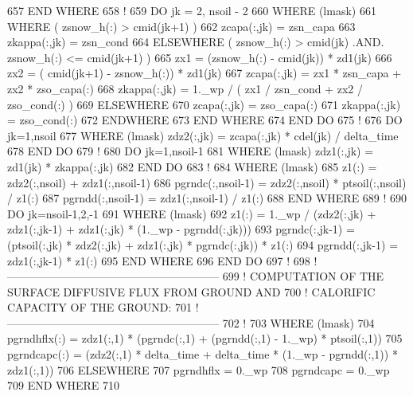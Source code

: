 \begin{DoxyCode}
657 \textcolor{keywordflow}{  END WHERE}
658 \textcolor{comment}{!}
659   \textcolor{keywordflow}{DO} jk = 2, nsoil - 2
660     \textcolor{keywordflow}{WHERE} (lmask)
661        \textcolor{keywordflow}{WHERE} ( zsnow\_h(:) > cmid(jk+1) )
662           zcapa(:,jk) = zsn\_capa
663           zkappa(:,jk) = zsn\_cond
664        \textcolor{keywordflow}{ELSEWHERE} ( zsnow\_h(:) > cmid(jk) .AND. zsnow\_h(:) <= cmid(jk+1) )
665           zx1 = (zsnow\_h(:) - cmid(jk)) * zd1(jk)
666           zx2 = ( cmid(jk+1) - zsnow\_h(:)) * zd1(jk)
667           zcapa(:,jk) = zx1 * zsn\_capa + zx2 * zso\_capa(:)
668           zkappa(:,jk) = 1.\_wp / ( zx1 / zsn\_cond + zx2 / zso\_cond(:) )
669        \textcolor{keywordflow}{ELSEWHERE}
670           zcapa(:,jk) = zso\_capa(:)
671           zkappa(:,jk) = zso\_cond(:)
672 \textcolor{keywordflow}{       ENDWHERE}
673 \textcolor{keywordflow}{     END WHERE}
674 \textcolor{keywordflow}{  END DO}
675 \textcolor{comment}{!}
676   \textcolor{keywordflow}{DO} jk=1,nsoil
677     \textcolor{keywordflow}{WHERE} (lmask) zdz2(:,jk) = zcapa(:,jk) * cdel(jk) / delta\_time
678 \textcolor{keywordflow}{  END DO}
679 \textcolor{comment}{!}
680   \textcolor{keywordflow}{DO} jk=1,nsoil-1
681     \textcolor{keywordflow}{WHERE} (lmask) zdz1(:,jk) = zd1(jk) * zkappa(:,jk)
682 \textcolor{keywordflow}{  END DO}
683 \textcolor{comment}{!}
684   \textcolor{keywordflow}{WHERE} (lmask)
685     z1(:) = zdz2(:,nsoil) + zdz1(:,nsoil-1)
686     pgrndc(:,nsoil-1) = zdz2(:,nsoil) * ptsoil(:,nsoil) / z1(:)
687     pgrndd(:,nsoil-1) = zdz1(:,nsoil-1) / z1(:)
688 \textcolor{keywordflow}{  END WHERE}
689 \textcolor{comment}{!}
690   \textcolor{keywordflow}{DO} jk=nsoil-1,2,-1
691     \textcolor{keywordflow}{WHERE} (lmask)
692       z1(:) = 1.\_wp / (zdz2(:,jk) + zdz1(:,jk-1) + zdz1(:,jk) * (1.\_wp - pgrndd(:,jk)))
693       pgrndc(:,jk-1) = (ptsoil(:,jk) * zdz2(:,jk) + zdz1(:,jk) * pgrndc(:,jk)) * z1(:)
694       pgrndd(:,jk-1) = zdz1(:,jk-1) * z1(:)
695 \textcolor{keywordflow}{    END WHERE}
696 \textcolor{keywordflow}{  END DO}
697 \textcolor{comment}{!}
698 \textcolor{comment}{!   ---------------------------------------------------------}
699 \textcolor{comment}{!   COMPUTATION OF THE SURFACE DIFFUSIVE FLUX FROM GROUND AND}
700 \textcolor{comment}{!   CALORIFIC CAPACITY OF THE GROUND:}
701 \textcolor{comment}{!   ---------------------------------------------------------}
702 \textcolor{comment}{!}
703   \textcolor{keywordflow}{WHERE} (lmask)
704     pgrndhflx(:) = zdz1(:,1) * (pgrndc(:,1) + (pgrndd(:,1) - 1.\_wp) * ptsoil(:,1))
705     pgrndcapc(:) = (zdz2(:,1) * delta\_time + delta\_time * (1.\_wp - pgrndd(:,1)) * zdz1(:,1))
706   \textcolor{keywordflow}{ELSEWHERE}
707     pgrndhflx = 0.\_wp
708     pgrndcapc = 0.\_wp
709 \textcolor{keywordflow}{  END WHERE}
710 
\end{DoxyCode}


